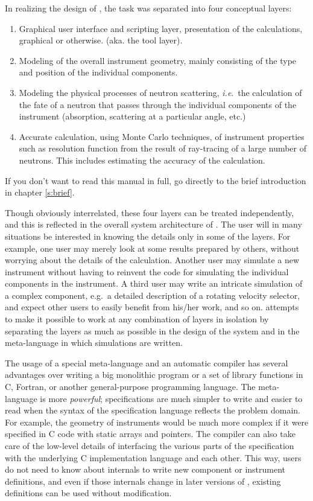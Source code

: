 In realizing the design of \MCS, the task was
separated into four conceptual layers:
\begin{enumerate}
\item Graphical user interface and scripting layer, presentation of
  the calculations, graphical or otherwise. (aka. the tool layer).
\item Modeling of the overall instrument geometry, mainly consisting
  of the type and position of the individual components.
\item Modeling the physical processes of neutron scattering, \textit{i.e}.\
  the calculation of the fate of a neutron that passes through the
  individual components of the instrument (absorption, scattering at a
  particular angle, etc.)
\item Accurate calculation, using Monte Carlo techniques, of
  instrument properties such as resolution function from the result of
  ray-tracing of a large number of neutrons. This includes estimating
  the accuracy of the calculation.
\end{enumerate}

If you don't want to read this manual in full, go directly to the brief introduction in chapter \ref{s:brief}.

Though obviously interrelated, these four layers can be
treated independently, and this is reflected in the overall system
architecture of \MCS. The user will in many situations be
interested in knowing the details only in some of the layers. For
example, one user may merely look at some results prepared by others,
without worrying about the details of the calculation. Another user
may simulate a new instrument without having to reinvent the
code for simulating the individual components in the instrument. A third
user may write an intricate simulation of a complex component,
e.g.\ a detailed description of a rotating velocity selector,
and expect other users to easily
benefit from his/her work, and so on. \MCS attempts to make it
possible to work at any combination of layers in isolation by separating
the layers as much as possible in the design of the system and in
the meta-language in which simulations are written.

The usage of a special meta-language and an automatic compiler has
several advantages over writing a big monolithic program or a set of
library functions in C, Fortran, or another general-purpose programming
language.  The meta-language is more \textit{powerful}; specifications
are much simpler to write and easier to read when the syntax of the
specification language reflects the problem domain. For example, the
geometry of instruments would be much more complex if it were specified
in C code with static arrays and pointers. The compiler can also take
care of the low-level details of interfacing the various parts of the
specification with the underlying C implementation language and each
other. This way, users do not need to know about \MCS internals to
write new component or instrument definitions, and even if those
internals change in later versions of \MCS, existing definitions can be
used without modification.

